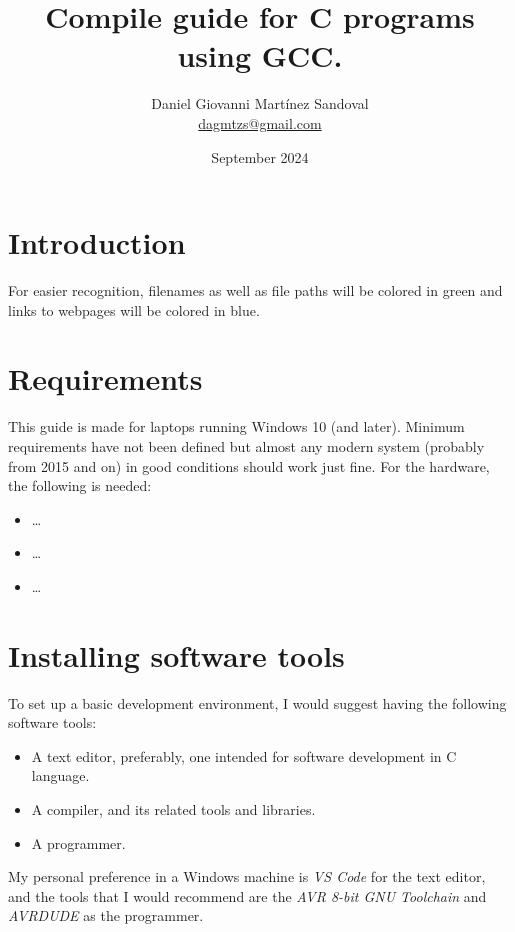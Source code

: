 \documentclass[10pt,letterpaper]{article}
\title{Compile guide for C programs using GCC.}
\author{Daniel Giovanni Martínez Sandoval\\ \small{\href{mailto:dagmtzs@gmail.com}{dagmtzs@gmail.com}}}
\date{September 2024}
\begin{document}
\maketitle
\newpage
\tableofcontents	

\section{Introduction}
For easier recognition, filenames as well as file paths will be colored in {\color{ForestGreen}green} and links to webpages will be colored in {\color{blue}blue}.

\section{Requirements}
This guide is made for laptops running Windows 10 (and later). Minimum requirements have not been defined but almost any modern system (probably from 2015 and on) in good conditions should work just fine. For the hardware, the following is needed:
\begin{itemize}
    \item \dots
    \item \dots
    \item \dots
\end{itemize}

\section{Installing software tools}
To set up a basic development environment, I would suggest having the following software tools:
\begin{itemize}
    \item A text editor, preferably, one intended for software development in C language.
    \item A compiler, and its related tools and libraries.
    \item A programmer.
\end{itemize}
My personal preference in a Windows machine is \textit{VS Code} for the text editor, and the tools that I would recommend are the \textit{AVR 8-bit GNU Toolchain} and \textit{AVRDUDE} as the programmer.
\end{document}
